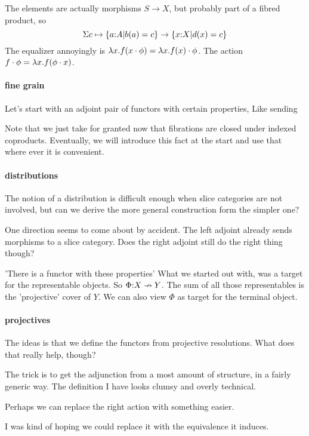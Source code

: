 \documentclass[csh.tex]{subfiles}
\begin{document}
The elements are actually morphisms $S \to X$, but probably part of a fibred product, so 
\[\Sigma c\mapsto {\left\{a\mathord :A|b(a) = c\right\} \to \left\{ x\mathord :X | d(x) = c\right\}}\]
The equalizer annoyingly is $\lambda x . {f(x\cdot \phi)} = \lambda x . f(x)\cdot \phi$. The action $f\cdot \phi = \lambda x .{f(\phi\cdot x)}$. 


\paragraph{fine grain}
Let's start with an adjoint pair of functors with certain properties,
Like sending 

Note that we just take for granted now that fibrations are closed under indexed coproducts. Eventually, we will introduce this fact at the start and use that where ever it is convenient.

\paragraph{distributions}
The notion of a distribution is difficult enough when slice categories are not involved, but can we derive the more general construction form the simpler one?

One direction seems to come about by accident. The left adjoint already sends morphisms to a slice category. Does the right adjoint still do the right thing though?

'There is a functor with these properties'
What we started out with, was a target for the representable objects.
So $\Phi \mathord : X\nrightarrow Y$.
The sum of all those representables is the 'projective' cover of $Y$.
We can also view $\Phi$ as target for the terminal object.

\paragraph{projectives}
The ideas is that we define the functors from projective resolutions.
What does that really help, though?

The trick is to get the adjunction from a most amount of structure, in a fairly generic way. The definition I have looks clumsy and overly technical.

Perhaps we can replace the right action with something easier.

I was kind of hoping we could replace it with the equivalence it induces. 
\end{document}
